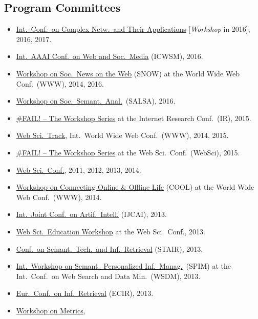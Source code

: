 \documentclass[line,mm]{res}
\newcounter{x}
\newcounter{y}
\begin{document}
\begin{resume}
\section{Program Committees}
\begin{itemize}
\item \href{http://www.complexnetworks.org/}{Int.\ Conf.\ on Complex
  Netw.\ and Their Applications} [\emph{Workshop} in 2016], 2016, 2017.   
\item \href{http://www.icwsm.org/2016/index.php}{Int.\ AAAI Conf.\ on
  Web and Soc.\ Media} (ICWSM), 2016.
\item \href{http://www.snow-workshop.org/}{Workshop on Soc.\ News on
  the Web} (SNOW) at the World Wide Web Conf.\ (WWW), 2014, 2016. 
\item \href{http://events.kmi.open.ac.uk/salsa2016/}{Workshop on Soc.\ Semant.\ Anal.}\ (SALSA), 2016.
\item \href{https://failworkshops.wordpress.com/fail-at-ir16/}{\#FAIL!
  -- The Workshop Series} at the Internet Research Conf.\ (IR), 2015.
\item \href{http://www.www2015.it/call-for-web-science-track/}{Web
  Sci.\ Track}, Int.\ World Wide Web Conf.\ (WWW), 2014, 2015.
\item \href{https://failworkshops.wordpress.com/fail-workshop-at-websci15/}{\#FAIL! -- The Workshop Series} at the Web Sci.\ Conf.\ (WebSci), 2015.
\item \href{http://www.websci14.org/}{Web Sci.\ Conf.},
  2011, 2012, 2013, 2014. 
\item \href{http://www.cool2014.com/}{Workshop on Connecting Online \&
  Offline Life} (COOL) at the World Wide Web Conf.\ (WWW), 2014. 
\item \href{http://ijcai13.org/}{Int.\ Joint Conf.\ on Artif.\ Intell.} (IJCAI), 2013.  
\item \href{http://webscience-education-workshop.blogs.usj.edu.lb/}{Web
  Sci.\ Education Workshop} at the Web Sci.\ Conf., 2013. 
\item \href{http://www.ftsm.ukm.my/stair13/}{Conf.\ on Semant.\ Tech.\ and Inf.\ Retrieval} (STAIR), 2013. 
\item \href{http://spim-workshop.org/}{Int.\ Workshop on Semant.\ Personalized Inf.\ Manag.}\ (SPIM) at the Int.\ Conf.\ on Web
  Search and Data Min.\ (WSDM), 2013.  
\item \href{http://ecir2013.org/}{Eur.\ Conf.\ on Inf.\ Retrieval} (ECIR), 2013.  
\item \href{http://mama.west.uni-koblenz.de/}{Workshop on Metrics,
}
\end{itemize}
\end{resume}
\end{document}
